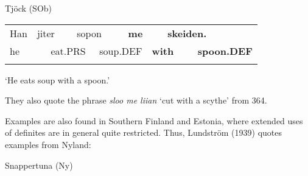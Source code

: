 \begin{styleExLtrTblii}
Tjöck (SOb)

\end{styleExLtrTblii}

\begin{tabular}{llllllllll}
\lsptoprule
Han & \multicolumn{2}{l}{jiter

} & \multicolumn{2}{l}{sopon

} & \multicolumn{2}{l}{{\bfseries me}

} & \multicolumn{2}{l}{{\bfseries skeiden.}

} & \\
\multicolumn{2}{l}{he

} & \multicolumn{2}{l}{eat.PRS

} & \multicolumn{2}{l}{soup.DEF

} & \multicolumn{2}{l}{{\bfseries with}

} & \multicolumn{2}{l}{{\bfseries spoon.DEF}

}\\
\lspbottomrule
\end{tabular}

\begin{styleTranslation}
‘He eats soup with a spoon.’

\end{styleTranslation}

\begin{styleBodyTextFirst}
They also quote the phrase \textit{sloo me liian} ‘cut with a scythe’ from 364. 

\end{styleBodyTextFirst}

\begin{styleBodytextC}
Examples are also found in Southern Finland and Estonia, where extended uses of definites are in general quite restricted. Thus, Lundström (1939) quotes examples from Nyland:

\end{styleBodytextC}


\begin{listWWNumileveli}
\item {}

\begin{styleExample}
Snappertuna (Ny) 

\end{styleExample}

\end{listWWNumileveli}

